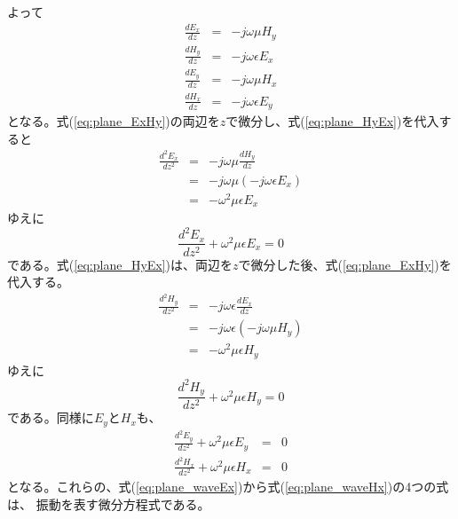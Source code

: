 よって
\begin{eqnarray}
\frac{dE_x}{dz} &=& -j\omega\mu H_y \label{eq:plane_ExHy}\\
\frac{dH_y}{dz} &=& -j\omega\epsilon E_x \label{eq:plane_HyEx}\\
\frac{dE_y}{dz} &=& -j\omega\mu H_x \label{eq:plane_EyHx}\\
\frac{dH_x}{dz} &=& -j\omega\epsilon E_y \label{eq:plane_HxEy}
\end{eqnarray}
となる。式(\ref{eq:plane_ExHy})の両辺を$z$で微分し、式(\ref{eq:plane_HyEx})を代入すると
\begin{eqnarray*}
\frac{d^2E_x}{dz^2} &=& -j\omega\mu \frac{dH_y}{dz} \nonumber\\
&=& -j\omega\mu (-j\omega\epsilon E_x) \nonumber\\
&=& -\omega^2\mu\epsilon E_x \nonumber
\end{eqnarray*}
ゆえに
\begin{equation}
\frac{d^2E_x}{dz^2} + \omega^2\mu\epsilon E_x = 0\label{eq:plane_waveEx}
\end{equation}
である。式(\ref{eq:plane_HyEx})は、両辺を$z$で微分した後、式(\ref{eq:plane_ExHy})を代入する。
\begin{eqnarray*}
\frac{d^2H_y}{dz^2} &=& -j\omega\epsilon\frac{dE_x}{dz} \nonumber \\
&=&-j\omega\epsilon(-j\omega\mu H_y) \nonumber\\
&=&-\omega^2\mu\epsilon H_y
\end{eqnarray*}
ゆえに
\begin{equation}
\frac{d^2H_y}{dz^2} + \omega^2\mu\epsilon H_y = 0\label{eq:plane_waveHy}
\end{equation}
である。同様に$E_y$と$H_x$も、
\begin{eqnarray}
\frac{d^2E_y}{dz^2} + \omega^2\mu\epsilon E_y &=& 0 \label{eq:plane_waveEy}\\
\frac{d^2H_x}{dz^2} + \omega^2\mu\epsilon H_x &=& 0\label{eq:plane_waveHx}
\end{eqnarray}
となる。これらの、式(\ref{eq:plane_waveEx})から式(\ref{eq:plane_waveHx})の4つの式は、
振動を表す微分方程式である。

